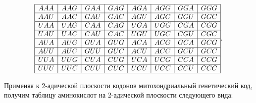 {

$$

\begin{array}{|c|c|c|c|c|c|c|c|}



\hline AAA & AAG & GAA & GAG & AGA & AGG & GGA & GGG \cr



\hline AAU & AAC & GAU & GAC & AGU & AGC & GGU & GGC \cr



\hline UAA & UAG & CAA & CAG & UGA & UGG & CGA & CGG \cr



\hline UAU & UAC & CAU & CAC & UGU & UGC & CGU & CGC \cr



\hline AUA & AUG & GUA & GUG & ACA & ACG & GCA & GCG \cr



\hline AUU & AUC & GUU & GUC & ACU & ACC & GCU & GCC \cr



\hline UUA & UUG & CUA & CUG & UCA & UCG & CCA & CCG \cr



\hline UUU & UUC & CUU & CUC & UCU & UCC & CCU & CCC \cr



\hline\end{array}.

$$

}





Применяя к 2-адической плоскости кодонов митохондриальный генетический код, получим таблицу аминокислот на 2-адической плоскости следующего вида:

